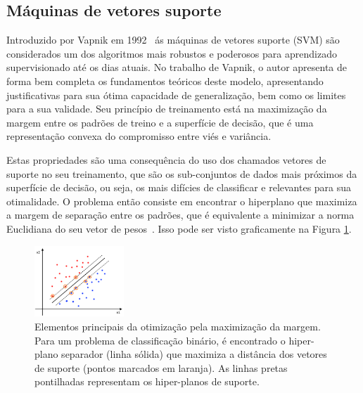 \documentclass[conference]{IEEEtran}
\begin{document}
	
	   
    
	\subsection{Máquinas de vetores suporte}
	Introduzido por Vapnik em 1992~\cite{boser1992training} ás máquinas de vetores suporte (SVM) são considerados um dos algoritmos mais robustos e poderosos para aprendizado supervisionado até os dias atuais. No trabalho de Vapnik, o autor apresenta de forma bem completa os fundamentos teóricos deste modelo, apresentando justificativas para sua ótima capacidade de generalização, bem como os limites para a sua validade. Seu princípio de treinamento está na maximização da margem entre os padrões de treino e a superfície de decisão, que é uma representação convexa do compromisso entre viés e variância.
	
	Estas propriedades são uma consequência do uso dos chamados vetores de suporte no seu treinamento, que são os sub-conjuntos de dados mais próximos da superfície de decisão, ou seja, os mais difícies de classificar e relevantes para sua otimalidade. O problema então consiste em encontrar o hiperplano que maximiza a margem de separação entre os padrões, que é equivalente a minimizar a norma Euclidiana do seu vetor de pesos~\cite{haykin2007neural}. Isso pode ser visto graficamente na Figura \ref{fig:svm}.
	
	\begin{figure}[thpbh]
		\centering
		\includegraphics[width=0.3\textwidth]{svm-hp.png}
		\caption{Elementos principais da otimização pela maximização da margem. Para um problema de classificação binário, é encontrado o hiper-plano separador (linha sólida) que maximiza a distância dos vetores de suporte (pontos marcados em laranja). As linhas pretas pontilhadas representam os hiper-planos de suporte.}
		\label{fig:svm}
	\end{figure}
	
\end{document}

